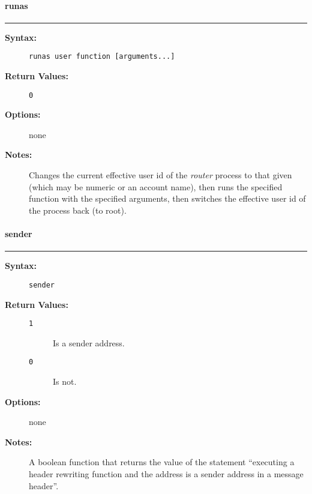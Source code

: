 \vspace {2pt}


\paragraph{runas}

\hrule
\begin{description}
\item[{\bf Syntax:}] \mbox{}

{\tt runas user function [arguments...]}

\item[{\bf Return Values:}] \mbox{}

\begin{description}
\item[{\tt 0}] \mbox{}



\end{description}


\item[{\bf Options:}] \mbox{}

none  

\item[{\bf Notes:}] \mbox{}

Changes the current effective user id 
of the {\em router\/} process to that given (which may be 
numeric or an account name), then runs the specified function 
with the specified arguments, then switches the effective 
user id of the process back (to root). 

\end{description}


\vspace {2pt}


\paragraph{sender}

\hrule
\begin{description}
\item[{\bf Syntax:}] \mbox{}

{\tt sender}

\item[{\bf Return Values:}] \mbox{}

\begin{description}
\item[{\tt 1}] \mbox{}

Is a sender address.

\item[{\tt 0}] \mbox{}

Is not.

\end{description}


\item[{\bf Options:}] \mbox{}

none  

\item[{\bf Notes:}] \mbox{}

A boolean function that returns the value of 
the statement ``executing a header rewriting function and the address 
is a sender address in a message header''. 

\end{description}


